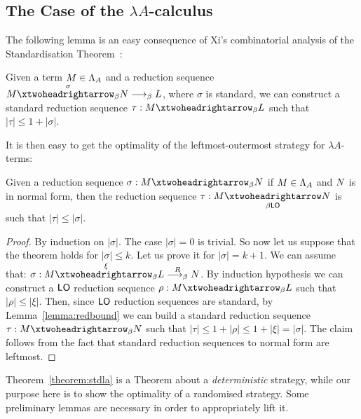 \subsection{The Case of the $\lambda A$-calculus}\label{sec:lambdaA}
The following lemma is an easy consequence of Xi's combinatorial
analysis of the Standardisation Theorem~\cite{xi_upper_1999}:
\begin{lemma}\label{lemma:redbound}
	Given a term $M\in\Lambda_A$ and a reduction sequence $\termone\redbetared{\sigma}
	\termtwo \redbeta \termthree$, where $\sigma$ is standard, we can construct
	a standard reduction sequence
	$\tau:\termone\redbetared{} \termthree$ such that $|\tau|\leq
	1+|\sigma|$.
\end{lemma}
It is then easy to get the optimality of the leftmost-outermost
strategy for $\lambda A$-terms:
\begin{theorem}\label{theorem:stdla}
	Given a reduction sequence
	$\sigma:\termone \redbetared{} \termtwo$
	if $M\in\Lambda_A$ and $N$ is in normal form, then the
	reduction sequence $\tau:\termone\redbetaredlo{} \termtwo$ is
	such that $|\tau|\leq |\sigma|$.
\end{theorem}
\begin{proof}
	By induction on $|\sigma|$. The case $|\sigma|=0$ is trivial. So now
	let us suppose that the theorem holds for $|\sigma|\leq k$. Let us
	prove it for $|\sigma|= k+1$. We can assume that:
	$\sigma:\termone \redbetared{\xi} \termthree \redbetardx{\rdxone} \termtwo$.
	By induction hypothesis we can construct a $\textsf{LO}$ reduction
	sequence $\rho:\termone \redbetared{} \termthree$ such that
	$|\rho|\leq |\xi|$. Then, since $\textsf{LO}$ reduction sequences are standard, by Lemma~\ref{lemma:redbound} we
	can build a standard reduction sequence
	$\tau:\termone\redbetared{} \termtwo$ such that $|\tau|\leq
	1+|\rho|\leq 1+|\xi|=|\sigma|$. The claim follows from the fact
	that standard reduction sequences to normal form are leftmost.
\end{proof}
Theorem~\ref{theorem:stdla} is a Theorem about a \emph{deterministic}
strategy, while our purpose here is to show the optimality of a
randomised strategy. Some preliminary lemmas are necessary in
order to appropriately lift it.

